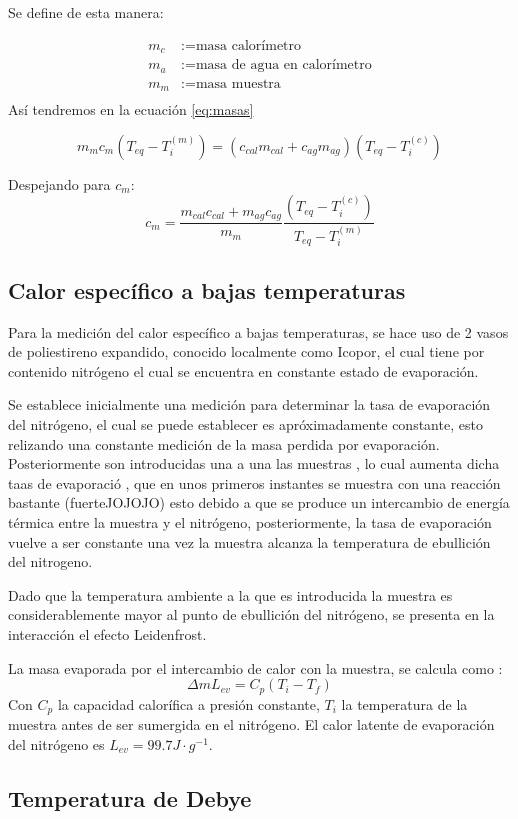     Se define de esta manera:
    
    \begin{align*}
        m_c&:= \textrm{masa calorímetro}\\
        m_a&:= \textrm{masa de agua en calorímetro}\\
        m_m&:= \textrm{masa muestra}\\
    \end{align*}
Así tendremos en la ecuación \ref{eq:masas} 

\begin{equation}
    m_mc_m(T_{eq}-T_i^{(m)})=(c_{cal}m_{cal}+c_{ag}m_{ag})(T_{eq}-T_i^{(c)})
\end{equation}

Despejando para $c_m$:
\begin{equation}
    c_m=\frac{m_{cal}c_{cal}+m_{ag}c_{ag}}{m_m}\frac{(T_{eq}-T_i^{(c)})}{T_{eq}-T_i^{(m)}}
\end{equation}

\subsection{Calor específico a bajas temperaturas}
Para la medición del calor específico a bajas temperaturas, se hace uso de 2 vasos de poliestireno expandido, conocido localmente como Icopor, el cual tiene por contenido nitrógeno el cual se encuentra en constante estado de evaporación.

Se establece inicialmente una medición para determinar la tasa de evaporación del nitrógeno, el cual se puede establecer es apróximadamente constante, esto relizando una constante medición de la masa perdida por evaporación.
Posteriormente son introducidas una a una las muestras , lo cual aumenta dicha taas de evaporació , que en unos primeros instantes se muestra con una reacción bastante (fuerteJOJOJO)  esto debido a que se produce un intercambio de energía térmica entre la muestra y el nitrógeno, posteriormente, la tasa de evaporación vuelve a ser constante una vez la muestra alcanza la temperatura de ebullición del nitrogeno.

Dado que la temperatura ambiente a la que es introducida la muestra es considerablemente mayor al punto de ebullición del nitrógeno, se presenta en la interacción el efecto Leidenfrost.

La masa evaporada por el intercambio de calor con la muestra, se calcula como :
\begin{equation}
    \Delta m L_{ev}=C_p(T_i-T_f)
\end{equation}
Con $C_p$ la capacidad calorífica  a presión constante, $T_i$ la temperatura de la muestra antes de ser sumergida en el nitrógeno.  El calor latente de evaporación del nitrógeno es $L_{ev}=99.7 J \cdot g^{-1}$.

\subsection{Temperatura de Debye}